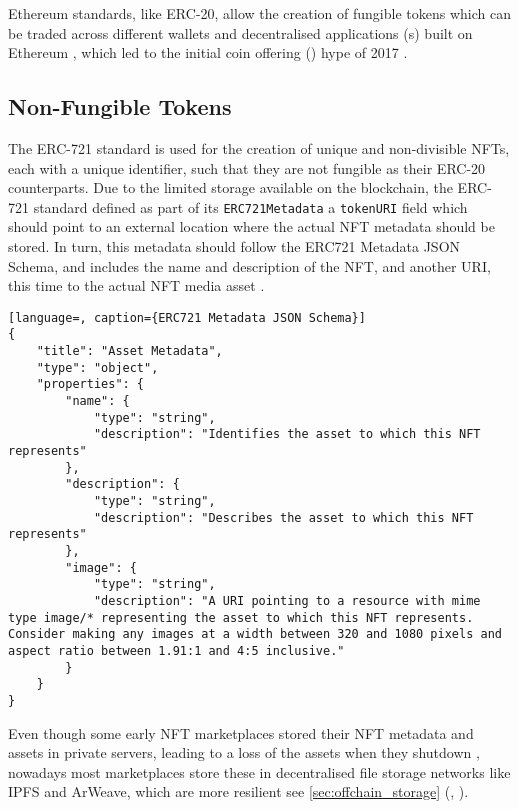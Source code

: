 Ethereum standards, like ERC-20, allow the creation of fungible tokens which can be traded across different wallets and \gls{decentralised application}s (s) built on Ethereum \cite{ERC20TokenStandarda}, which led to the \gls{initial coin offering} () hype of 2017 \cite{cuffeRoleErc20Token2018}.


\subsection{Non-Fungible Tokens}

The ERC-721 standard is used for the creation of unique and non-divisible NFTs, each with a unique identifier, such that they are not fungible as their ERC-20 counterparts.
Due to the limited storage available on the blockchain, the ERC-721 standard defined as part of its \texttt{ERC721Metadata} a \texttt{tokenURI} field which should point to an external location where the actual NFT metadata should be stored. In turn, this metadata should follow the ERC721 Metadata JSON Schema, and includes the name and description of the NFT, and another URI, this time to the actual NFT media asset \cite{ERC721NonFungibleToken}.

\begin{lstlisting}[language=, caption={ERC721 Metadata JSON Schema}]
{
    "title": "Asset Metadata",
    "type": "object",
    "properties": {
        "name": {
            "type": "string",
            "description": "Identifies the asset to which this NFT represents"
        },
        "description": {
            "type": "string",
            "description": "Describes the asset to which this NFT represents"
        },
        "image": {
            "type": "string",
            "description": "A URI pointing to a resource with mime type image/* representing the asset to which this NFT represents. Consider making any images at a width between 320 and 1080 pixels and aspect ratio between 1.91:1 and 4:5 inclusive."
        }
    }
}
\end{lstlisting}

Even though some early NFT marketplaces stored their NFT metadata and assets in private servers, leading to a loss of the assets when they shutdown \cite{gallenHistoryNFTMarketplaces2023}, nowadays most marketplaces store these in decentralised file storage networks like IPFS and ArWeave, which are more resilient  see \autoref{sec:offchain_storage} (, \pageref{sec:offchain_storage}).


